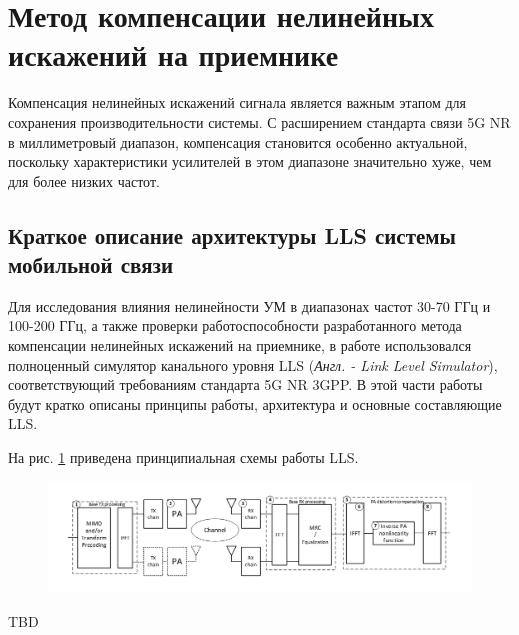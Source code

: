 \section{Метод компенсации нелинейных искажений на приемнике}
Компенсация нелинейных искажений сигнала является важным этапом для
сохранения производительности системы. С расширением стандарта связи 5G NR
в миллиметровый диапазон, компенсация становится особенно актуальной,
поскольку характеристики усилителей в этом диапазоне значительно хуже, чем
для более низких частот.


\subsection{Краткое описание архитектуры LLS системы мобильной связи}

Для исследования влияния нелинейности УМ в диапазонах частот 30-70 ГГц и
100-200 ГГц, а также проверки работоспособности разработанного метода
компенсации нелинейных искажений на приемнике, в работе использовался
полноценный симулятор канального уровня LLS (\textit{Англ. - Link Level
Simulator}), соответствующий требованиям стандарта 5G NR 3GPP. В этой части
работы будут кратко описаны принципы работы, архитектура и основные
составляющие LLS. 

На рис. \ref{fig:lls_scheme} приведена принципиальная схемы работы LLS.
\begin{figure}[h!]
    \centering
    \includegraphics[width=0.99\linewidth]{figs/lls_scheme.png}
    \caption{}
    \label{fig:lls_scheme}
\end{figure}

TBD

